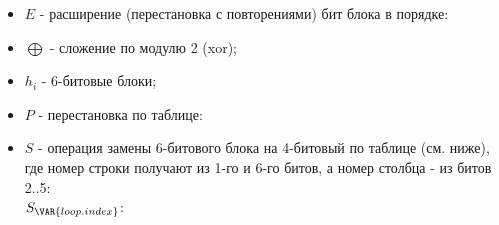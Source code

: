 \begin{itemize}
\item $E$ \-- расширение (перестановка с повторениями) бит блока в порядке:
\item $\bigoplus$ \-- сложение по модулю 2 (xor);
\item $h_i$ \-- 6-битовые блоки;
\item $P$ \-- перестановка по таблице:
\item $S$ \-- операция замены 6-битового блока на 4-битовый по таблице (см. ниже),
где номер строки получают из 1-го и 6-го битов, а номер столбца \-- из битов 2..5: \\
    $S_\VAR{loop.index}$:
\end{itemize}

